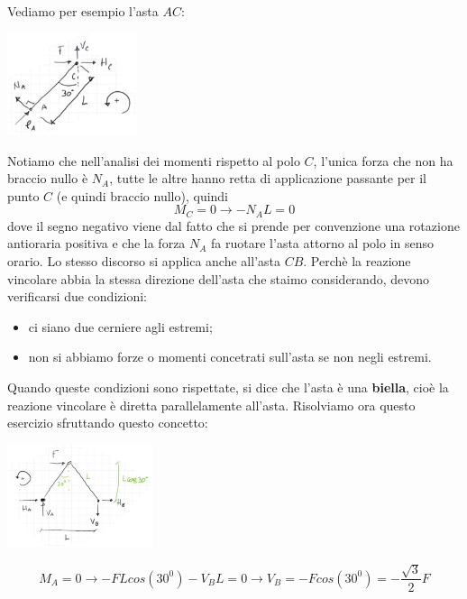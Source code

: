 Vediamo per esempio l'asta $AC$:
\begin{center}
    \includegraphics[height=3cm]{../lezione7/img3.JPG}
\end{center}
Notiamo che nell'analisi dei momenti rispetto al polo $C$, l'unica forza che non ha braccio nullo è $N_A$, tutte le altre hanno retta di applicazione passante per il punto $C$ (e quindi braccio nullo), quindi 
\[
    M_C = 0 \rightarrow -N_A L = 0
\]
dove il segno negativo viene dal fatto che si prende per convenzione una rotazione antioraria positiva e che la forza $N_A$ fa ruotare l'asta attorno al polo in senso orario.\newline
Lo stesso discorso si applica anche all'asta $CB$.\newline
\newline
Perchè la reazione vincolare abbia la stessa direzione dell'asta che staimo considerando, devono verificarsi due condizioni:
\begin{itemize}
    \item ci siano due cerniere agli estremi;
    \item non si abbiamo forze o momenti concetrati sull'asta se non negli estremi.
\end{itemize}
Quando queste condizioni sono rispettate, si dice che l'asta è una \textbf{biella}, cioè la reazione vincolare è diretta parallelamente all'asta.\newline
\newline
Risolviamo ora questo esercizio sfruttando questo concetto:
\begin{center}
    \includegraphics[height=3cm]{../lezione7/img4.JPG}
\end{center}
\[
    M_A = 0 \rightarrow -FL cos(30^0) - V_B L = 0 \rightarrow V_B = -F cos(30^0) = - \frac{\sqrt{3}}{2}F
\]
